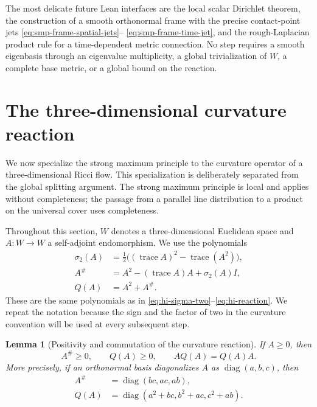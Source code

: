 \documentclass[10pt]{coll-l}
\newcommand{\trace}{\operatorname{trace}}
\newtheorem{lemma}[theorem]{Lemma}
\theoremstyle{definition}
\theoremstyle{remark}
\numberwithin{section}{chapter}
\numberwithin{equation}{chapter}
\begin{document}
The most delicate future Lean interfaces are the local scalar Dirichlet
theorem, the construction of a smooth orthonormal frame with the precise
contact-point jets \eqref{eq:smp-frame-spatial-jets}--
\eqref{eq:smp-frame-time-jet}, and the rough-Laplacian product rule for a
time-dependent metric connection.  No step requires a smooth eigenbasis
through an eigenvalue multiplicity, a global trivialization of $W$, a
complete base metric, or a global bound on the reaction.

\section{The three-dimensional curvature reaction}
\label{sec:curvature-three-dimensional-reaction}

We now specialize the strong maximum principle to the curvature operator of
a three-dimensional Ricci flow.  This specialization is deliberately
separated from the global splitting argument.  The strong maximum principle
is local and applies without completeness; the passage from a parallel line
distribution to a product on the universal cover uses completeness.

Throughout this section, $W$ denotes a three-dimensional Euclidean space and
$A\colon W\to W$ a self-adjoint endomorphism.  We use the polynomials
\begin{align}
 \sigma _2(A)
   &=\frac12\bigl((\trace A)^2-\trace(A^2)\bigr),
                                                        \label{eq:smp-sigma-two}\\
 A^\#&=A^2-(\trace A)A+\sigma _2(A)I,                  \label{eq:smp-adjugate}\\
 Q(A)&=A^2+A^\#.                                      \label{eq:smp-curvature-reaction}
\end{align}
These are the same polynomials as in
\eqref{eq:hi-sigma-two}--\eqref{eq:hi-reaction}.  We repeat the notation
because the sign and the factor of two in the curvature convention will be
used at every subsequent step.

\begin{lemma}[Positivity and commutation of the curvature reaction]
\label{lem:curvature-reaction-positive-commuting}
If $A\geq0$, then
\[
                 A^\#\geq0,
        \qquad    Q(A)\geq0,
        \qquad    A Q(A)=Q(A)A.
\]
More precisely, if an orthonormal basis diagonalizes $A$ as
$\operatorname{diag}(a,b,c)$, then
\begin{align}
 A^\#&=\operatorname{diag}(bc,ac,ab),                  \label{eq:smp-adjugate-diagonal}\\
 Q(A)&=\operatorname{diag}
       (a^2+bc,b^2+ac,c^2+ab).                         \label{eq:smp-Q-diagonal}
\end{align}
\end{lemma}
\end{document}
